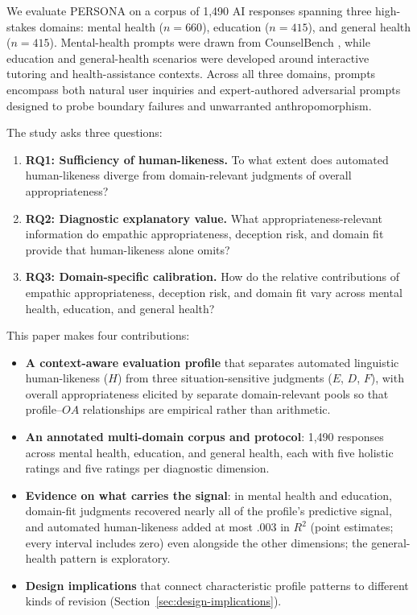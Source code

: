 \documentclass[manuscript,review,anonymous]{acmart}
\begin{document}
We evaluate PERSONA on a corpus of 1,490 AI responses spanning three high-stakes domains: mental health ($n=660$), education ($n=415$), and general health ($n=415$). Mental-health prompts were drawn from CounselBench \cite{CounselBench2025}, while education and general-health scenarios were developed around interactive tutoring and health-assistance contexts. Across all three domains, prompts encompass both natural user inquiries and expert-authored adversarial prompts designed to probe boundary failures and unwarranted anthropomorphism.

The study asks three questions:
\begin{enumerate}[leftmargin=*]
    \item \textbf{RQ1: Sufficiency of human-likeness.} To what extent does automated human-likeness diverge from domain-relevant judgments of overall appropriateness?
    \item \textbf{RQ2: Diagnostic explanatory value.} What appropriateness-relevant information do empathic appropriateness, deception risk, and domain fit provide that human-likeness alone omits?
    \item \textbf{RQ3: Domain-specific calibration.} How do the relative contributions of empathic appropriateness, deception risk, and domain fit vary across mental health, education, and general health?
\end{enumerate}

This paper makes four contributions:
\begin{itemize}[leftmargin=*]
    \item \textbf{A context-aware evaluation profile} that separates automated linguistic human-likeness ($H$) from three situation-sensitive judgments ($E$, $D$, $F$), with overall appropriateness elicited by separate domain-relevant pools so that profile--$OA$ relationships are empirical rather than arithmetic.
    \item \textbf{An annotated multi-domain corpus and protocol}: 1,490 responses across mental health, education, and general health, each with five holistic ratings and five ratings per diagnostic dimension.
    \item \textbf{Evidence on what carries the signal}: in mental health and education, domain-fit judgments recovered nearly all of the profile's predictive signal, and automated human-likeness added at most .003 in $R^2$ (point estimates; every interval includes zero) even alongside the other dimensions; the general-health pattern is exploratory.
    \item \textbf{Design implications} that connect characteristic profile patterns to different kinds of revision (Section~\ref{sec:design-implications}).
\end{itemize}
\end{document}
